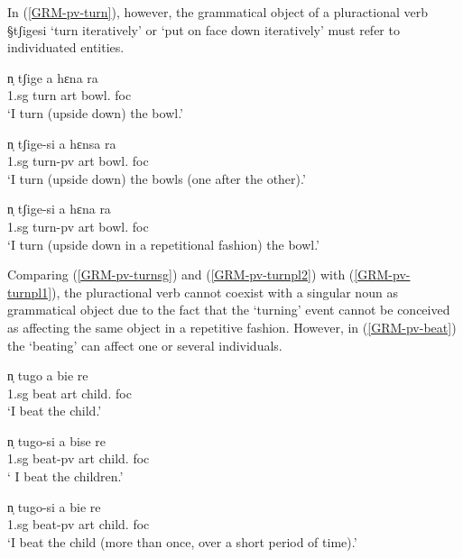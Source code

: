  In (\ref{GRM-pv-turn}), however,  the grammatical object of a
pluractional verb {\S tʃigesi} `turn iteratively' or `put on face
down iteratively'  must refer to individuated entities. 

\begin{exe}
\ex\label{GRM-pv-turn}
  \begin{xlist}
    \ex\label{GRM-pv-turnsg}
\gll   n̩  tʃige  a  hɛna  ra  \\
        {\sc 1.sg} {turn} {\sc art} {bowl.\sg} {\sc foc}\\
\glt `I turn (upside down) the bowl.'

 \ex\label{GRM-pv-turnpl1}
\gll   n̩  tʃige-si  a  hɛnsa  ra   \\
         {\sc 1.sg}   {turn-{\sc pv}} {\sc art} {bowl.\pl} {\sc foc}\\
\glt `I turn (upside down) the bowls (one after the other).'


 \ex\label{GRM-pv-turnpl2}
\gll {\textasteriskcentered}  n̩  tʃige-si   a  hɛna  ra \\
       {}  {\sc 1.sg}    {turn-{\sc pv}} {\sc art}  {bowl.\sg}  {\sc foc}\\
\glt `I turn (upside down in a repetitional fashion) the bowl.'

 \end{xlist}
\end{exe}

Comparing  (\ref{GRM-pv-turnsg}) and (\ref{GRM-pv-turnpl2}) with 
(\ref{GRM-pv-turnpl1}),   the pluractional verb cannot coexist with a singular
noun as grammatical object due to the fact that  the `turning' event cannot be
conceived as affecting the same object in a repetitive fashion. However, in
(\ref{GRM-pv-beat}) the `beating' can affect  one or several
individuals. 


\begin{exe}
\ex\label{GRM-pv-beat}
  \begin{xlist}
    \ex\label{GRM-pv-beat.sg}
\gll   n̩   tugo  a bie  re  \\
            {\sc 1.sg}  {beat} {\sc art} {child.\sg} {\sc foc}\\
\glt `I beat the child.'

\ex\label{GRM-pv-beat.pl1}
\gll   n̩    tugo-si  a bise  re   \\
         {\sc 1.sg}   {beat-{\sc pv}} {\sc art} {child.\pl} {\sc foc}\\
\glt ` I beat the children.'


\ex\label{GRM-pv-beat.pl2}
\gll    n̩    tugo-si  a  bie  re   \\
         {\sc 1.sg}    {beat-{\sc pv}} {\sc art}  {child.\sg} {\sc foc} \\
\glt `I beat the child (more than once, over a short period of time).'


 \end{xlist}
\end{exe}

